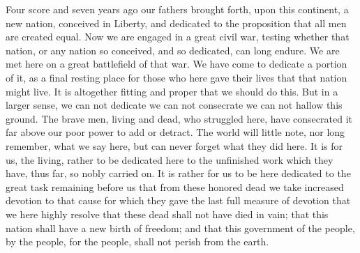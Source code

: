 \documentclass{article}
\begin{document}
Four score and seven years ago our fathers brought forth, upon this continent, a new nation, conceived in Liberty, and dedicated to the proposition that all men are created equal.
Now we are engaged in a great civil war, testing whether that nation, or any nation so conceived, and so dedicated, can long endure. We are met here on a great battlefield of that war. We have come to dedicate a portion of it, as a final resting place for those who here gave their lives that that nation might live. It is altogether fitting and proper that we should do this.
But in a larger sense, we can not dedicate we can not consecrate we can not hallow this ground. The brave men, living and dead, who struggled here, have consecrated it far above our poor power to add or detract. The world will little note, nor long remember, what we say here, but can never forget what they did here.
It is for us, the living, rather to be dedicated here to the unfinished work which they have, thus far, so nobly carried on. It is rather for us to be here dedicated to the great task remaining before us that from these honored dead we take increased devotion to that cause for which they gave the last full measure of devotion that we here highly resolve that these dead shall not have died in vain; that this nation shall have a new birth of freedom; and that this government of the people, by the people, for the people, shall not perish from the earth.
\end{document}
